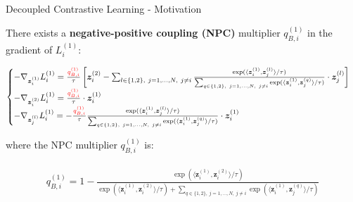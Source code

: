 \documentclass[aspectratio=169,mathserif]{beamer}  %
\newcommand{\tb}{\textbf}
\newcommand{\red}{\textcolor{red}}
\begin{document}
\begin{frame}{Decoupled Contrastive Learning - Motivation}

There exists a \tb{negative-positive coupling (NPC)} multiplier $q_{B,i}^{(1)}$ in the gradient of $L_i^{(1)}$:

\begin{eqnarray}
\begin{aligned}
\begin{cases}
-\nabla_{\bm{z}_i^{(1)}}L_i^{(1)}=\frac{\red{q_{B,i}^{(1)}}}{\tau}\left[\bm{z}_i^{(2)}-\sum_{l\in\{1,2\},\ j=1,\ldots,N,\ j\neq i} \frac{\exp (\langle \bm{z}_i^{(1)}, \bm{z}_j^{(l)} \rangle / \tau)}{\sum_{q\in \{1,2\},\ j=1,\ldots,N,\ j\neq i} \exp (\langle \bm{z}_i^{(1)}, \bm{z}_j^{(q)} \rangle / \tau)}\cdot\bm{z}_j^{(l)}\right]\\
-\nabla_{\bm{z}_i^{(2)}}L_i^{(1)}=\frac{\red{q_{B,i}^{(1)}}}{\tau} \cdot \bm{z}_i^{(1)}\\
-\nabla_{\bm{z}_j^{(l)}}L_i^{(1)}=-\frac{\red{q_{B,i}^{(1)}}}{\tau}\frac{\exp (\langle \bm{z}_i^{(1)}, \bm{z}_j^{(l)} \rangle / \tau)}{\sum_{q\in \{1,2\},\ j=1,\ldots,N,\ j\neq i} \exp (\langle \bm{z}_i^{(1)}, \bm{z}_j^{(q)} \rangle / \tau)}\cdot\bm{z}_i^{(1)}
\end{cases}
\end{aligned}
\end{eqnarray}

\pause

where the NPC multiplier $q_{B,i}^{(1)}$ is:

\begin{eqnarray}
\begin{aligned}
q_{B,i}^{(1)}=1-\frac{\exp (\langle \bm{z}_i^{(1)}, \bm{z}_i^{(2)} \rangle / \tau)}{\exp (\langle \bm{z}_i^{(1)}, \bm{z}_i^{(2)} \rangle / \tau) +\sum_{q\in \{1,2\},\ j=1,\ldots,N,\ j\neq i} \exp (\langle \bm{z}_i^{(1)}, \bm{z}_j^{(q)} \rangle / \tau)}
\end{aligned}
\end{eqnarray}

\end{frame}
\end{document}

